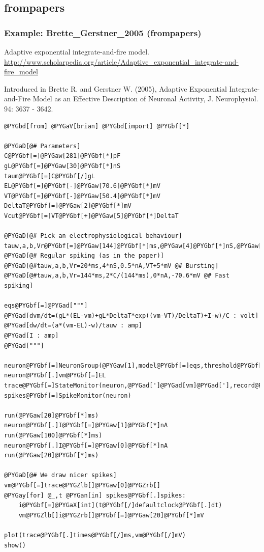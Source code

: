 \documentclass[letterpaper,10pt,english]{manual}
\begin{document}
\subsection{frompapers}

\resetcurrentobjects
\hypertarget{--doc-examples-frompapers_Brette_Gerstner_2005}{}

\hypertarget{index-41}{}\subsubsection{Example: Brette\_Gerstner\_2005 (frompapers)}

Adaptive exponential integrate-and-fire model.
\href{http://www.scholarpedia.org/article/Adaptive\_exponential\_integrate-and-fire\_model}{http://www.scholarpedia.org/article/Adaptive\_exponential\_integrate-and-fire\_model}

Introduced in Brette R. and Gerstner W. (2005), Adaptive Exponential
Integrate-and-Fire Model as an Effective Description of Neuronal Activity,
J. Neurophysiol. 94: 3637 - 3642.

\begin{Verbatim}[commandchars=@\[\]]
@PYGbd[from] @PYGaV[brian] @PYGbd[import] @PYGbf[*]

@PYGaD[@# Parameters]
C@PYGbf[=]@PYGaw[281]@PYGbf[*]pF
gL@PYGbf[=]@PYGaw[30]@PYGbf[*]nS
taum@PYGbf[=]C@PYGbf[/]gL
EL@PYGbf[=]@PYGbf[-]@PYGaw[70.6]@PYGbf[*]mV
VT@PYGbf[=]@PYGbf[-]@PYGaw[50.4]@PYGbf[*]mV
DeltaT@PYGbf[=]@PYGaw[2]@PYGbf[*]mV
Vcut@PYGbf[=]VT@PYGbf[+]@PYGaw[5]@PYGbf[*]DeltaT

@PYGaD[@# Pick an electrophysiological behaviour]
tauw,a,b,Vr@PYGbf[=]@PYGaw[144]@PYGbf[*]ms,@PYGaw[4]@PYGbf[*]nS,@PYGaw[0.0805]@PYGbf[*]nA,@PYGbf[-]@PYGaw[70.6]@PYGbf[*]mV @PYGaD[@# Regular spiking (as in the paper)]
@PYGaD[@#tauw,a,b,Vr=20*ms,4*nS,0.5*nA,VT+5*mV @# Bursting]
@PYGaD[@#tauw,a,b,Vr=144*ms,2*C/(144*ms),0*nA,-70.6*mV @# Fast spiking]

eqs@PYGbf[=]@PYGad["""]
@PYGad[dvm/dt=(gL*(EL-vm)+gL*DeltaT*exp((vm-VT)/DeltaT)+I-w)/C : volt]
@PYGad[dw/dt=(a*(vm-EL)-w)/tauw : amp]
@PYGad[I : amp]
@PYGad["""]

neuron@PYGbf[=]NeuronGroup(@PYGaw[1],model@PYGbf[=]eqs,threshold@PYGbf[=]Vcut,reset@PYGbf[=]@PYGad["]@PYGad[vm=Vr;w+=b]@PYGad["],freeze@PYGbf[=]@PYGaA[True])
neuron@PYGbf[.]vm@PYGbf[=]EL
trace@PYGbf[=]StateMonitor(neuron,@PYGad[']@PYGad[vm]@PYGad['],record@PYGbf[=]@PYGaw[0])
spikes@PYGbf[=]SpikeMonitor(neuron)

run(@PYGaw[20]@PYGbf[*]ms)
neuron@PYGbf[.]I@PYGbf[=]@PYGaw[1]@PYGbf[*]nA
run(@PYGaw[100]@PYGbf[*]ms)
neuron@PYGbf[.]I@PYGbf[=]@PYGaw[0]@PYGbf[*]nA
run(@PYGaw[20]@PYGbf[*]ms)

@PYGaD[@# We draw nicer spikes]
vm@PYGbf[=]trace@PYGZlb[]@PYGaw[0]@PYGZrb[]
@PYGay[for] @_,t @PYGan[in] spikes@PYGbf[.]spikes:
    i@PYGbf[=]@PYGaX[int](t@PYGbf[/]defaultclock@PYGbf[.]dt)
    vm@PYGZlb[]i@PYGZrb[]@PYGbf[=]@PYGaw[20]@PYGbf[*]mV

plot(trace@PYGbf[.]times@PYGbf[/]ms,vm@PYGbf[/]mV)
show()
\end{Verbatim}
\end{document}
